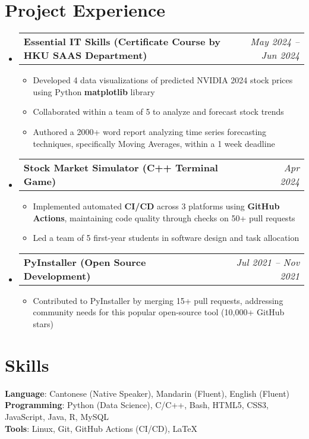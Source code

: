 \documentclass[a4paper,11pt]{article}
\makeatletter
\newcommand{\iconlink}[3]{
  \href{#2}{#1~#3}
}
\newcommand{\resumeItem}[1]{
  \item\small{
    {#1}
  }
}
\newcommand{\resumeProjectHeading}[2]{
  \vspace{-2pt}\item
    \begin{tabular*}{0.97\textwidth}[t]{@{}l@{\extracolsep{\fill}}r@{}}
      \raggedright\small#1 & \textit{\small#2} \\
    \end{tabular*}\vspace{-7pt}
}
\newcommand{\resumeSubHeadingListStart}{\begin{itemize}[leftmargin=0.15in, label={}, itemsep=1pt]}
\newcommand{\resumeSubHeadingListEnd}{\end{itemize}}
\newcommand{\resumeItemListStart}{
  \begin{itemize}[
    leftmargin=0.2in,    %
    rightmargin=0.2in,   %
    itemindent=0pt,       %
    labelindent=0pt,      %
    labelsep=0.1in,       %
    itemsep=1pt,          %
    parsep=0pt            %
  ]
}
\newcommand{\resumeItemListEnd}{\end{itemize}}
\makeatother
\begin{document}
\section{Project Experience}
  \resumeSubHeadingListStart
    \resumeProjectHeading
      {\textbf{Essential IT Skills (Certificate Course by HKU SAAS Department)} \iconlink{\faGithub}{https://github.com/eric15342335/essential-IT}}{May 2024 -- Jun 2024}
      \resumeItemListStart
        \resumeItem{Developed 4 data visualizations of predicted NVIDIA 2024 stock prices using Python \textbf{matplotlib} library}
        \resumeItem{Collaborated within a team of 5 to analyze and forecast stock trends}
        \resumeItem{Authored a 2000+ word report analyzing time series forecasting techniques, specifically Moving Averages, within a 1 week deadline}
      \resumeItemListEnd
    \resumeProjectHeading
      {\textbf{Stock Market Simulator (C++ Terminal Game)} \iconlink{\faGithub}{https://github.com/eric15342335/comp2113-engg1340-group-project}}{Apr 2024}
      \resumeItemListStart
        \resumeItem{Implemented automated \textbf{CI/CD} across 3 platforms using \textbf{GitHub Actions}, maintaining code quality through checks on 50+ pull requests}
        \resumeItem{Led a team of 5 first-year students in software design and task allocation}
      \resumeItemListEnd
    \resumeProjectHeading
    {\textbf{PyInstaller (Open Source Development)} \iconlink{\faGithub}{https://github.com/pyinstaller/pyinstaller-hooks-contrib}}{Jul 2021 -- Nov 2021}
      \resumeItemListStart
        \resumeItem{Contributed to PyInstaller by merging 15+ pull requests, addressing community needs for this popular open-source tool (10,000+ GitHub stars)}
      \resumeItemListEnd
  \resumeSubHeadingListEnd
\section{Skills}
  \begin{itemize}[leftmargin=0.15in, label={}]
    \small{\item{
      \textbf{Language}{: Cantonese (Native Speaker), Mandarin (Fluent), English (Fluent)} \\[2pt]
      \textbf{Programming}{: Python (Data Science), C/C++, Bash, HTML5, CSS3, JavaScript, Java, R, MySQL} \\[2pt]
      \textbf{Tools}{: Linux, Git, GitHub Actions (CI/CD), LaTeX}
    }}
  \end{itemize}
\end{document}

